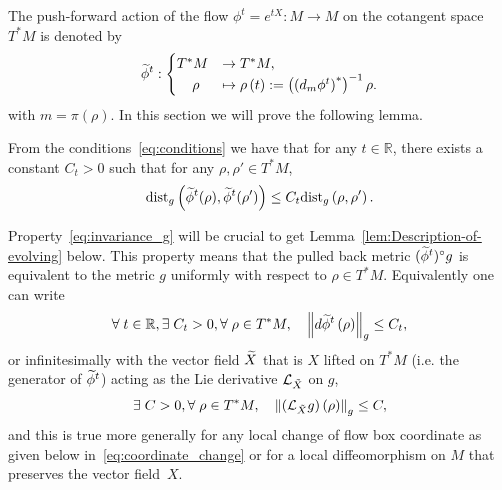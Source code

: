 \documentclass[AHL,Unicode,longabstracts,published]{cedram}
\newcommand{\clL}{\mathcal{L}}
\newcommand{\dist}{\mathrm{dist}}
\newcommand{\bbR}{\mathbb{R}}
\let\oldtilde\tilde
\renewcommand*{\tilde}[1]{\mathchoice{\widetilde{#1}}{\widetilde{#1}}{\oldtilde{#1}}{\oldtilde{#1}}}
\let\oldexists\exists
\renewcommand*{\exists}{\mathrel{\oldexists}}
\let\oldforall\forall
\renewcommand*{\forall}{\mathrel{\oldforall}}
\newcommand{\bbR}{\mathbb{R}}
\begin{document}
The push-forward action of the flow $\phi^{t}=e^{tX}:M\rightarrow M$ on the cotangent space $T^{*}M$ is denoted by
\begin{equation}\label{eq:lifted_flow}
\tilde{\phi}^{t}:
\begin{cases}
T^{*}M & \rightarrow T^{*}M,\\
\mkern20mu\rho & \mapsto\rho\left(t\right):=\left(\left(d_{m}\phi^{t}\right)^{*}\right)^{-1}\rho.
\end{cases}
\end{equation}
with $m=\pi(\rho)$. In this section we will prove the following lemma.

\begin{cBoxB}{}
\begin{lemm}\label{lem:Lipschitz_property}
From the conditions~\eqref{eq:conditions} we have that for any $t\in\bbR$, there exists a constant $C_{t}>0$ such that for any $\rho,\rho'\in T^{*}M$,
\begin{equation}\label{eq:invariance_g}
\dist_{g}\left(\tilde{\phi}^{t}(\rho),\tilde{\phi}^{t}(\rho')\right)\le C_{t}\dist_{g}\left(\rho,\rho'\right).
\end{equation}
\end{lemm}
\end{cBoxB}

\begin{rema}
Property~\eqref{eq:invariance_g} will be crucial to get Lemma~\ref{lem:Description-of-evolving} below. This property means that the pulled back metric $(\tilde{\phi}^{t})^{\circ}g$ is equivalent to the metric $g$ uniformly with respect to $\rho\in T^{*}M$. Equivalently one can write
\[
\forall t\in\bbR,\exists C_{t}>0,\forall\rho\in T^{*}M,\quad\left\Vert d\tilde{\phi}^{t}\left(\rho\right)\right\Vert _{g}\leq C_{t},
\]
or infinitesimally with the vector field $\tilde{X}$ that is $X$ lifted on $T^{*}M$ (i.e. the generator of $\tilde{\phi}^{t}$) acting as the Lie derivative $\clL_{\tilde{X}}$ on $g$,
\[
\exists C>0,\forall\rho\in T^{*}M,\quad\left\Vert \left(\clL_{\tilde{X}}g\right)\left(\rho\right)\right\Vert _{g}\leq C,
\]
and this is true more generally for any local change of flow box coordinate as given below in~\eqref{eq:coordinate_change} or for a local diffeomorphism on $M$ that preserves the vector field~$X$.
\end{rema}
\end{document}
